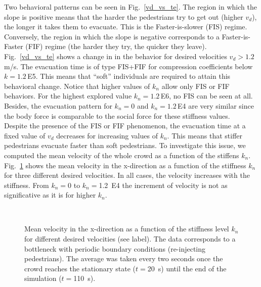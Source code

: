 \documentclass[preprint,12pt]{elsarticle}
\begin{document}
Two behavioral patterns can be seen in Fig.~\ref{vd_vs_te}. 
The region in which the slope is positive means that the 
harder the pedestrians try to get out (higher $v_d$), the 
longer it takes them to evacuate. This is the Faster-is-slower 
(FIS) regime. Conversely, the region in which the slope is 
negative  corresponds to a Faster-is-Faster (FIF) regime (the 
harder they try, the quicker they leave). Fig.~\ref{vd_vs_te} shows a change in 
in the behavior for desired velocities $v_d>1.2\,$m/s. The 
evacuation time is of type FIS+FIF for compression coefficients below 
$k=1.2\,$E5. This means that ``soft'' individuals are required to attain this 
behavioral change.  Notice that higher values of $k_n$ allow 
only FIS or FIF behaviors. For the highest explored value $k_n=1.2\,$E6, no 
FIS can be seen at all. Besides, the evacuation pattern for $k_n = 0$ and $k_n 
= 1.2\,$E4 are very similar since the body force is comparable to the social 
force for these stiffness values. \\

Despite the presence of the FIS or FIF phenomenon, the evacuation time at a 
fixed value of $v_d$ decreases for increasing values of $k_n$. This means that 
stiffer pedestrians evacuate faster than soft pedestrians. To investigate this 
issue, we computed the mean velocity of the whole crowd as a function of the 
stiffens $k_n$. Fig.~\ref{kn_vs_vx_bottleneck} shows the mean velocity in the 
x-direction as a function of the stiffness $k_n$ for three different desired 
velocities. In all cases, the velocity increases with the stiffness. From 
$k_n=0$ to $k_n=$1.2~E4 the increment of velocity is not as significative as it 
is for higher $k_n$. \\


\begin{figure}[!htbp]
\centering
    \\
\caption[width=0.47\columnwidth]{Mean velocity in the x-direction as a function 
of the stiffness level $k_n$ for different desired velocities (see label). The 
data corresponds to a bottleneck with periodic boundary conditions (re-injecting 
pedestrians). The average was taken every two seconds once the crowd reaches the 
stationary state ($t=$20~s) until the end of the simulation ($t=$110~s). }
\label{kn_vs_vx_bottleneck}
\end{figure}
\end{document}
